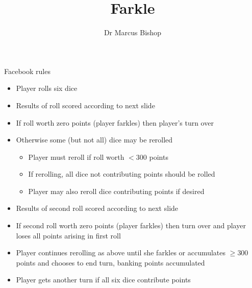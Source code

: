 \documentclass[handout]{beamer}
\title[Farkle]{Farkle}
\author{Dr Marcus Bishop}
\theoremstyle{definition}
\begin{document}
\begin{frame}\titlepage\end{frame}
\LogoOff

\begin{frame}{Facebook rules}
\begin{itemize}
\item Player rolls six dice
\item Results of roll scored according to next slide
\item If roll worth zero points (player \alert{farkles})
then player's turn over
\item Otherwise some (but not all) dice
\alert{may} be rerolled
\begin{itemize}
\item Player \alert{must} reroll
if roll worth $<300$ points
\item If rerolling, all dice not contributing points
should be rolled
\item Player \alert{may} also reroll dice contributing points if desired
\end{itemize}
\item Results of second roll scored according to next slide
\item If second roll worth zero points
(player \alert{farkles}) then turn over and
player loses all points arising in first roll
\item Player continues rerolling as above
until she farkles or accumulates $\ge 300$ points and
chooses to end turn, banking points accumulated
\item Player gets another turn if all six
dice contribute points
\end{itemize}
\end{frame}
\end{document}

